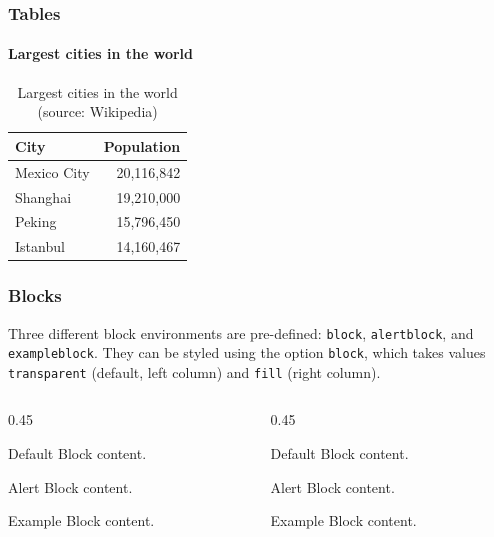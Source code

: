 \documentclass[10pt]{beamer}
\begin{document}
\begin{frame}
  \frametitle{Tables}
  \framesubtitle{Largest cities in the world}
  \begin{table}
    \caption{Largest cities in the world (source: Wikipedia)}
    \begin{tabular}{@{} lr @{}}
      \toprule
      City        & Population \\
      \midrule
      Mexico City & 20,116,842 \\
      Shanghai    & 19,210,000 \\
      Peking      & 15,796,450 \\
      Istanbul    & 14,160,467 \\
      \bottomrule
    \end{tabular}
  \end{table}
\end{frame}
\begin{frame}[fragile]
  \frametitle{Blocks}
  Three different block environments are pre-defined: \verb|block|,
  \verb|alertblock|,
  and \verb|exampleblock|. They can be styled using the option
  \verb|block|, which takes values \verb|transparent| (default, left
  column) and \verb|fill| (right column).

  \begin{columns}[T]
    \begin{column}{0.45\textwidth}
      \begin{block}{Default}
        Block content.
      \end{block}

      \begin{alertblock}{Alert}
        Block content.
      \end{alertblock}

      \begin{exampleblock}{Example}
        Block content.
      \end{exampleblock}
    \end{column}
    \begin{column}{0.45\textwidth}
      {

        \begin{block}{Default}
          Block content.
        \end{block}

        \begin{alertblock}{Alert}
          Block content.
        \end{alertblock}

        \begin{exampleblock}{Example}
          Block content.
        \end{exampleblock}
      }
    \end{column}
  \end{columns}
\end{frame}
\end{document}
